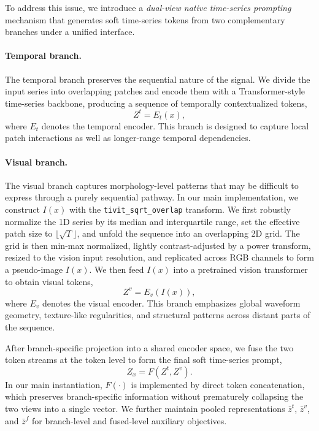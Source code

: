 \documentclass{article}
\begin{document}
    To address this issue, we introduce a \emph{dual-view native time-series prompting} mechanism that generates soft time-series tokens from two complementary branches under a unified interface.
    
    \paragraph{Temporal branch.}
    The temporal branch preserves the sequential nature of the signal.
    We divide the input series into overlapping patches and encode them with a Transformer-style time-series backbone, producing a sequence of temporally contextualized tokens,
    \begin{equation}
    Z^{t} = E_t(x),
    \end{equation}
    where $E_t$ denotes the temporal encoder.
    This branch is designed to capture local patch interactions as well as longer-range temporal dependencies.
    
    \paragraph{Visual branch.}
    The visual branch captures morphology-level patterns that may be difficult to express through a purely sequential pathway.
    In our main implementation, we construct $I(x)$ with the \texttt{tivit\_sqrt\_overlap} transform.
    We first robustly normalize the 1D series by its median and interquartile range, set the effective patch size to $\lfloor \sqrt{T} \rfloor$, and unfold the sequence into an overlapping 2D grid.
    The grid is then min-max normalized, lightly contrast-adjusted by a power transform, resized to the vision input resolution, and replicated across RGB channels to form a pseudo-image $I(x)$.
    We then feed $I(x)$ into a pretrained vision transformer to obtain visual tokens,
    \begin{equation}
    Z^{v} = E_v(I(x)),
    \end{equation}
    where $E_v$ denotes the visual encoder.
    This branch emphasizes global waveform geometry, texture-like regularities, and structural patterns across distant parts of the sequence.
    
    After branch-specific projection into a shared encoder space, we fuse the two token streams at the token level to form the final soft time-series prompt,
    \begin{equation}
    Z_x = F(Z^{t}, Z^{v}).
    \end{equation}
    In our main instantiation, $F(\cdot)$ is implemented by direct token concatenation, which preserves branch-specific information without prematurely collapsing the two views into a single vector.
    We further maintain pooled representations $\bar{z}^{t}$, $\bar{z}^{v}$, and $\bar{z}^{f}$ for branch-level and fused-level auxiliary objectives.
    
\end{document}
